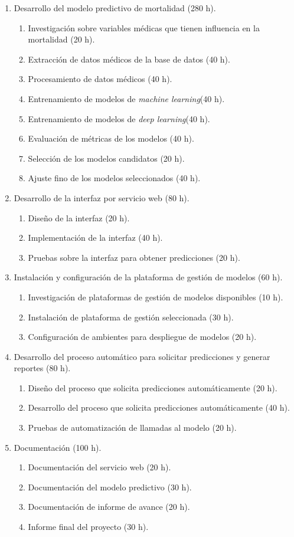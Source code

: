\documentclass[
11pt, %
]{charter}
\begin{document}
\begin{enumerate}
\item Desarrollo del modelo predictivo de mortalidad (280 h).
	\begin{enumerate}
	\item Investigación sobre variables médicas que tienen influencia en la mortalidad (20 h).
	\item Extracción de datos médicos de la base de datos (40 h).
	\item Procesamiento de datos médicos (40 h).
	\item Entrenamiento de modelos de \textit{machine learning}(40 h).
	\item Entrenamiento de modelos de \textit{deep learning}(40 h).
	\item Evaluación de métricas de los modelos (40 h).
	\item Selección de los modelos candidatos (20 h).
	\item Ajuste fino de los modelos seleccionados (40 h).	
	\end{enumerate}
\item Desarrollo de la interfaz por servicio web (80 h).
	\begin{enumerate}
	\item Diseño de la interfaz (20 h).
	\item Implementación de la interfaz (40 h).
	\item Pruebas sobre la interfaz para obtener predicciones (20 h).	
	\end{enumerate}
\item Instalación y configuración de la plataforma de gestión de modelos (60 h).
	\begin{enumerate}
	\item Investigación de plataformas de gestión de modelos disponibles (10 h).
	\item Instalación de plataforma de gestión seleccionada (30 h).
	\item Configuración de ambientes para despliegue de modelos (20 h).
	\end{enumerate}
\item Desarrollo del proceso automático para solicitar predicciones y generar reportes (80 h).
	\begin{enumerate}
	\item Diseño del proceso que solicita predicciones automáticamente (20 h).
	\item Desarrollo del proceso que solicita predicciones automáticamente (40 h).
	\item Pruebas de automatización de llamadas al modelo (20 h).
	\end{enumerate}
\item Documentación (100 h).
	\begin{enumerate}
	\item Documentación del servicio web (20 h).
	\item Documentación del modelo predictivo (30 h).
	\item Documentación de informe de avance (20 h).
	\item Informe final del proyecto (30 h).
	\end{enumerate}
\end{enumerate}
\end{document}

